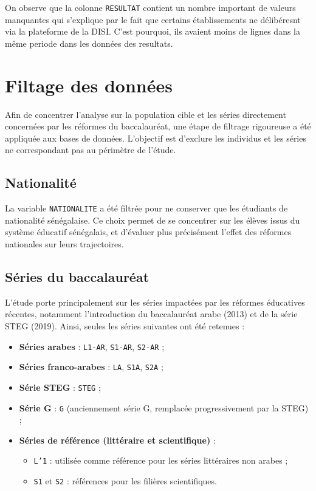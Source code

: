 On observe que la colonne \texttt{RESULTAT} contient un nombre important de valeurs manquantes qui s’explique par le fait que certains établissements ne délibéresnt via la plateforme de la DISI.
C'est pourquoi, ils avaient moins de lignes dans la même periode dans les données des resultats.

\section{Filtage des données}

Afin de concentrer l’analyse sur la population cible et les séries directement concernées par les réformes du baccalauréat, une étape de filtrage rigoureuse a été appliquée aux bases de données. 
L’objectif est d’exclure les individus et les séries ne correspondant pas au périmètre de l’étude.

\subsection{Nationalité}

La variable \texttt{NATIONALITE} a été filtrée pour ne conserver que les étudiants de nationalité sénégalaise. 
Ce choix permet de se concentrer sur les élèves issus du système éducatif sénégalais, et d’évaluer plus précisément l’effet des réformes nationales sur leurs trajectoires.

\subsection{Séries du baccalauréat}

L’étude porte principalement sur les séries impactées par les réformes éducatives récentes, notamment l’introduction du baccalauréat arabe (2013) et de la série STEG (2019). Ainsi, seules les séries suivantes ont été retenues :

\begin{itemize}
    \item \textbf{Séries arabes} : \texttt{L1-AR}, \texttt{S1-AR}, \texttt{S2-AR} ;
    \item \textbf{Séries franco-arabes} : \texttt{LA}, \texttt{S1A}, \texttt{S2A} ;
    \item \textbf{Série STEG} : \texttt{STEG} ;
    \item \textbf{Série G} : \texttt{G} (anciennement série G, remplacée progressivement par la STEG) ;
    \item \textbf{Séries de référence (littéraire et scientifique)} :
        \begin{itemize}
            \item \texttt{L'1} : utilisée comme référence pour les séries littéraires non arabes ;
            \item \texttt{S1} et \texttt{S2} : références pour les filières scientifiques.
        \end{itemize}
\end{itemize}

